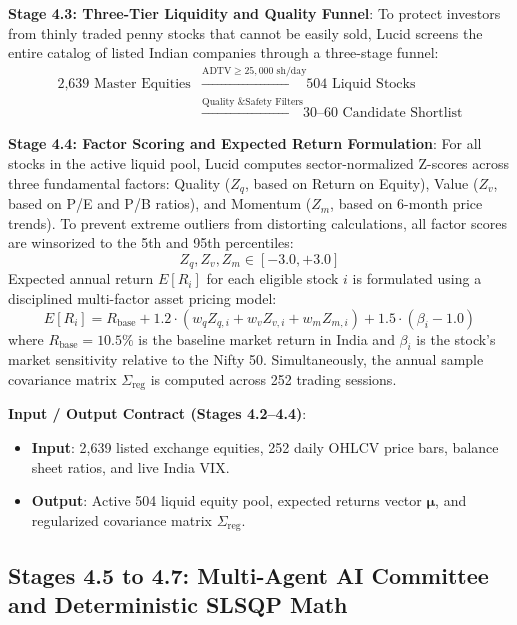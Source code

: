 \noindent \textbf{Stage 4.3: Three-Tier Liquidity and Quality Funnel}:
To protect investors from thinly traded penny stocks that cannot be easily sold, Lucid screens the entire catalog of listed Indian companies through a three-stage funnel:
\begin{equation}
\begin{aligned}
\text{2,639 Master Equities} &\xrightarrow{\text{ADTV} \ge 25,000 \text{ sh/day}} \text{504 Liquid Stocks} \\
&\xrightarrow{\text{Quality \& Safety Filters}} \text{30--60 Candidate Shortlist}
\end{aligned}
\end{equation}

\noindent \textbf{Stage 4.4: Factor Scoring and Expected Return Formulation}:
For all stocks in the active liquid pool, Lucid computes sector-normalized Z-scores across three fundamental factors: Quality ($Z_q$, based on Return on Equity), Value ($Z_v$, based on P/E and P/B ratios), and Momentum ($Z_m$, based on 6-month price trends). To prevent extreme outliers from distorting calculations, all factor scores are winsorized to the 5th and 95th percentiles:
\begin{equation}
Z_q, Z_v, Z_m \in [-3.0, +3.0]
\end{equation}
Expected annual return $E[R_i]$ for each eligible stock $i$ is formulated using a disciplined multi-factor asset pricing model:
\begin{equation}
E[R_i] = R_{\text{base}} + 1.2 \cdot \left( w_q Z_{q,i} + w_v Z_{v,i} + w_m Z_{m,i} \right) + 1.5 \cdot (\beta_i - 1.0)
\end{equation}
where $R_{\text{base}} = 10.5\%$ is the baseline market return in India and $\beta_i$ is the stock's market sensitivity relative to the Nifty 50. Simultaneously, the annual sample covariance matrix $\Sigma_{\text{reg}}$ is computed across 252 trading sessions.

\noindent \textbf{Input / Output Contract (Stages 4.2--4.4)}:
\begin{itemize}
    \item \textbf{Input}: 2,639 listed exchange equities, 252 daily OHLCV price bars, balance sheet ratios, and live India VIX.
    \item \textbf{Output}: Active 504 liquid equity pool, expected returns vector $\boldsymbol{\mu}$, and regularized covariance matrix $\Sigma_{\text{reg}}$.
\end{itemize}

\subsection{Stages 4.5 to 4.7: Multi-Agent AI Committee and Deterministic SLSQP Math}

